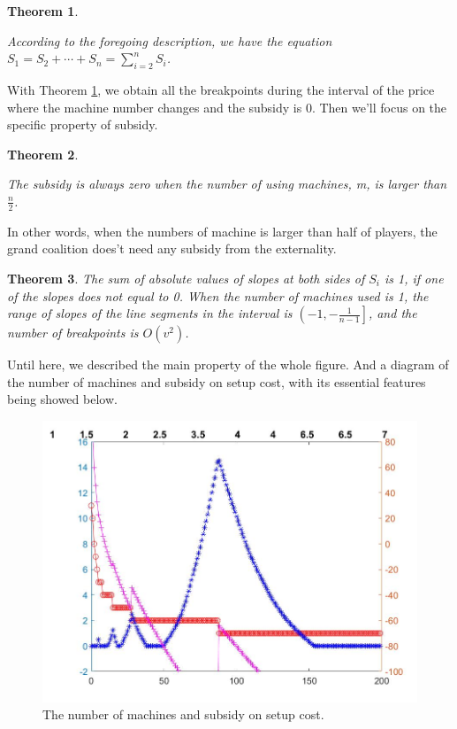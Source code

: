 \documentclass[UTF8]{article}
\newtheorem{thm}{\hspace{2em}Theorem}
\begin{document}
\begin{thm}\label{thm2}

According to the foregoing description, we have the equation $S_{1}=S_{2}+\cdots+S_{n}=\sum_{i=2}^n S_i$.

\end{thm}

With Theorem \ref{thm2}, we obtain all the breakpoints during the interval of the price where the machine number changes and the subsidy is $0$. Then we'll focus on the specific property of subsidy.

\begin{thm}\label{thm3}

The subsidy is always zero when the number of using machines, m, is larger than $\frac{n}{2}$.

\end{thm}

In other words, when the numbers of machine is larger than half of players, the grand coalition does't need any subsidy from the externality.

\begin{thm}\label{thm4}
The sum of absolute values of slopes at both sides of $S_i$ is 1, if one of the slopes does not equal to 0.
When the number of machines used is 1, the range of slopes of the line segments in the interval is $\left( -1 , -\frac{1}{n-1} \right]$, and the number of breakpoints is $ O(v^2) $.
\end{thm}

Until here, we described the main property of the whole figure.
And a diagram of the number of machines and subsidy on setup cost, with its essential features being showed below.

\begin{figure}[h]%
	\centering  %
	\includegraphics[width=0.8\linewidth]{Figures/Image30}  %
	\caption{The number of machines and subsidy on setup cost.}  %
	\label{fig:Image11}   %
\end{figure}
\end{document}
